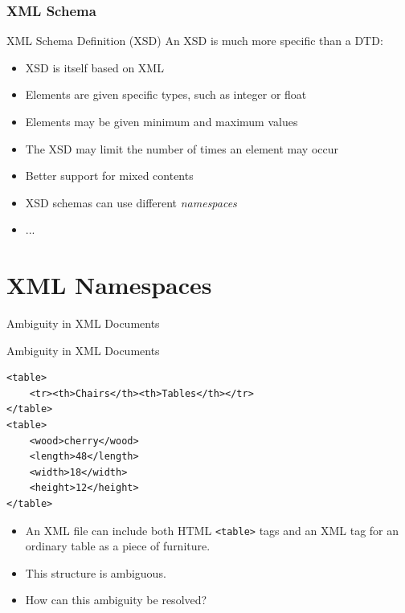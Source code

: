 \documentclass[svgnames]{beamer}
\begin{document}
\begin{frame}
\frametitle{XML Schema}

\begin{block}{XML Schema Definition (XSD)}
An XSD is much more specific than a DTD: 

\begin{itemize}
 \item XSD is itself based on XML
 \item Elements are given specific types, such as integer or float 
 \item Elements may be given minimum and maximum values
 \item The XSD may limit the number of times an element may occur
 \item Better support for mixed contents
 \item XSD schemas can use different {\it namespaces}
 \item ...
\end{itemize}
\end{block}

\end{frame}


\section{XML Namespaces}

\begin{frame}[fragile]{Ambiguity in XML Documents}
\footnotesize
\begin{block}{Ambiguity in XML Documents}
\begin{verbatim}
<table>
    <tr><th>Chairs</th><th>Tables</th></tr>
</table>
<table>
    <wood>cherry</wood>
    <length>48</length>
    <width>18</width>
    <height>12</height>
</table>
\end{verbatim}
\end{block}
\normalsize
\begin{itemize}
	\item An XML file can include both HTML \texttt{<table>} tags and an XML tag for an ordinary table as a piece of furniture.
	\item This structure is ambiguous.
	\item How can this ambiguity be resolved?
\end{itemize}
\end{frame}
\end{document}
